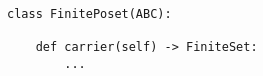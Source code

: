 \begin{verbatim}
class FinitePoset(ABC):

    def carrier(self) -> FiniteSet:
        ...
\end{verbatim}